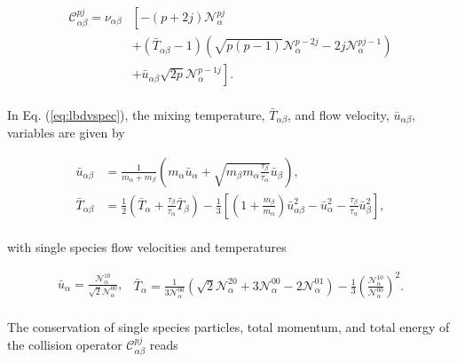 \documentclass[preprint,12pt]{elsarticle}
\begin{document}
\begin{align} \label{eq:lbdvspec}
 \mathcal{C}_{\alpha \beta}^{pj}   =   \nu_{\alpha \beta} &\left[   -   \left(   p   + 2  j   \right)  \mathcal{N}_\alpha^{pj}  \nonumber \right. \nonumber \\ & \left.   + \left( \bar  T_{\alpha \beta} - 1 \right)  \left( \sqrt{p (p-1)}    \mathcal{N}_\alpha^{p-2 j }     - 2 j  \mathcal{N}_\alpha^{p j-1 }  \right)  \nonumber \right. \nonumber \\ & \left. + \bar u_{\alpha \beta}    \sqrt{2 p}  \mathcal{N}_\alpha^{p-1 j}  \right].
\end{align}
\\
In Eq. (\ref{eq:lbdvspec}), the mixing temperature, $ \bar  T_{\alpha \beta}$, and flow velocity, $\bar u_{\alpha \beta}$, variables are given by \cite{ulbl2022}

\begin{subequations} \label{eq:mixingvars}
\begin{align}
\bar u_{\alpha \beta} & = \frac{1}{ m_\alpha  + m_\beta} \left(  m_\alpha \bar u_\alpha+ \sqrt{   m_\beta  m_\alpha \frac{ \tau_{  \beta }}{  \tau_{ \alpha}}} \bar u_\beta \right) , \\
\bar T_{\alpha \beta} & = \frac{1}{2} \left(\bar T_\alpha + \frac{ \tau_{\beta}}{\tau_{\alpha} } \bar T_\beta \right)-\frac{1}{3} \left[ \left( 1 + \frac{ m_\beta}{ m_\alpha}  \right) \bar u_{\alpha \beta}^2-\bar u_\alpha^2 -  \frac{ \tau_{ \beta}}{ \tau_{\alpha}} \bar u_\beta^2 \right],
\end{align}
\end{subequations}
\\
with single species flow velocities and temperatures

\begin{subequations} \label{eq:mixingvariable}
\begin{align}
\bar u_{\alpha} = \frac{ \mathcal{N}_\alpha^{10} }{ \sqrt{2} \mathcal{N}_\alpha^{00}},
\end{align}
\begin{align}
\bar T_\alpha =  \frac{1}{3 \mathcal{N}_\alpha^{00}} \left( \sqrt{2} \mathcal{N}_\alpha^{20} + 3 \mathcal{N}_\alpha^{00} - 2 \mathcal{N}_\alpha^{01}\right) - \frac{1}{3}  \left( \frac{ \mathcal{N}_\alpha^{10} }{  \mathcal{N}_\alpha^{00}}\right)^2.
\end{align}
\end{subequations}
\\
The conservation of single species particles, total momentum, and total energy of the collision operator $\mathcal{C}_{\alpha \beta}^{pj}$ reads
\end{document}

